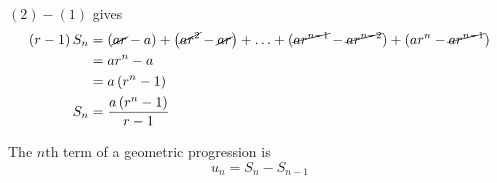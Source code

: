 \documentclass[11pt,a4paper]{book}
\begin{document}
$\left(2\right)-\left(1\right)$ gives
\begin{align*}
\left(r-1\right)S_{n} & =\left(\cancel{ar}-a\right)+\left(\cancel{ar^{2}}-\cancel{ar}\right)+\ldots+\left(\cancel{ar^{n-1}}-\cancel{ar^{n-2}}\right)+\left(ar^{n}-\cancel{ar^{n-1}}\right)\\
 & =ar^{n}-a\\
 & =a\left(r^{n}-1\right)\\
S_{n} & =\frac{a\left(r^{n}-1\right)}{r-1}
\end{align*}

\begin{tcolorbox}[colback=blue!5, colframe=black,boxrule=.4pt, sharpish corners]

The $n\text{th}$ term of a geometric progression is
\[
u_{n}=S_{n}-S_{n-1}
\]
\end{tcolorbox}
\end{document}

